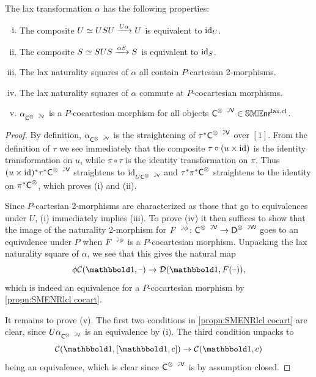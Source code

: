 \documentclass[a4paper,11pt]{article}
\begin{document}
\begin{propn}\label{propn:alpha props}
  The lax transformation $\alpha$ has the following properties:
  \begin{enumerate}[(i)]
  \item The composite $U \simeq USU \xto{U\alpha} U$ is equivalent to
    $\text{\textup{id}}_{U}$.    
  \item The composite $S \simeq SUS \xto{\alpha S} S$ is equivalent to
    $\text{\textup{id}}_{S}$.
  \item The lax naturality squares of $\alpha$ all contain
    $P$-cartesian 2-morphisms.
  \item The lax naturality squares of $\alpha$ commute at
    $P$-cocartesian morphisms.
  \item $\alpha_{\utract{C}{V}}$ is a $P$-cocartesian morphism for all
    objects $\utract{C}{V} \in \SMENRlcl$.
  \end{enumerate}
\end{propn}
\begin{proof}
  By definition, $\alpha_{\utract{C}{V}}$ is the straightening of
  $\tau^{*}\utract{C}{V}$ over $[1]$. From the definition of $\tau$ we
  see immediately that the composite $\tau \circ (u \times \text{\textup{id}})$ is
  the identity transformation on $u$, while $\pi \circ
  \tau$ is the identity transformation on $\pi$. Thus $(u \times
  \id)^{*}\tau^{*}\utract{C}{V}$ straightens to
  $\id_{U\utract{C}{V}}$ and $\tau^{*}\pi^{*}\textup{\textsf{C}}^{\otimes}$
  straightens to the identity on $\pi^{*}\textup{\textsf{C}}^{\otimes}$, which proves
  (i) and (ii).

  Since $P$-cartesian 2-morphisms are characterized as
  those that go to equivalences under $U$, (i) immediately implies
  (iii). To prove (iv) it then suffices to show that the image
  of the naturality 2-morphism for $\ract{F}{\phi} \colon
  \utract{C}{V} \to \utract{D}{W}$  goes to an equivalence under $P$
  when $\ract{F}{\phi}$ is a $P$-cocartesian morphism.   
  Unpacking the lax naturality square of $\alpha$, we see
  that this gives the natural map
  \[ \phi \eC(\bbone, \blank) \to \eD(\bbone, F(\blank)),\]
  which is indeed an equivalence for a $P$-cocartesian morphism by
  \cref{propn:SMENRlcl cocart}.
  
  It remains to prove (v). The first two conditions in
  \cref{propn:SMENRlcl cocart} are clear, since
  $U\alpha_{\utract{C}{V}}$ is an equivalence by (i). The third
  condition unpacks to
  \[ \eC(\bbone,[\bbone,c]) \to \eC(\bbone, c)\]
  being an equivalence, which is clear since $\utract{C}{V}$ is by
  assumption closed.
\end{proof}
\end{document}
